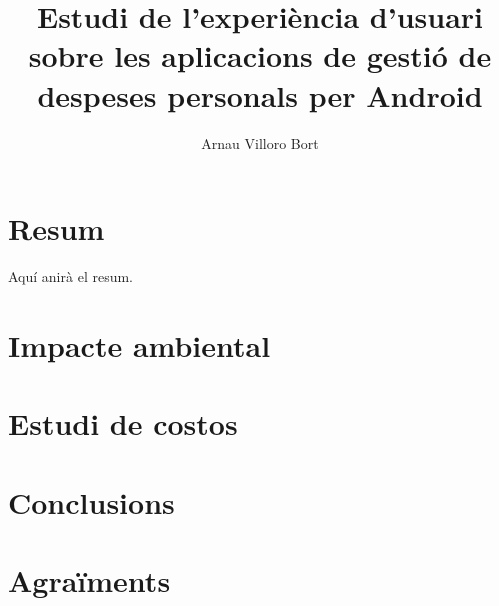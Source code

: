 \documentclass{book}
\title{Estudi de l'experiència d'usuari sobre les aplicacions de gestió de despeses personals per Android}
\author{Arnau Villoro Bort}
\begin{document}
\frontmatter




\chapter*{Resum} \label{sec:Resum}
Aquí anirà el resum.

\tableofcontents





\mainmatter








\chapter{Impacte ambiental}
\chapter{Estudi de costos}

\chapter{Conclusions}
\chapter{Agraïments}


\end{document}
